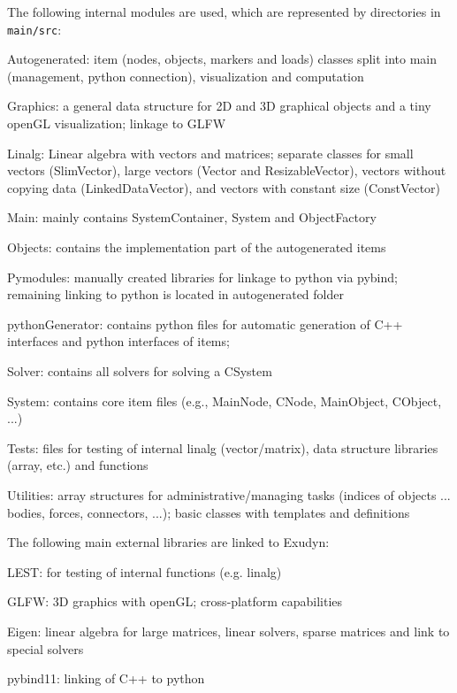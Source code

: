 The following internal modules are used, which are represented by directories in \texttt{main/src}:
\bi
	\item Autogenerated: item (nodes, objects, markers and loads) classes split into main (management, python connection), visualization and computation
	\item Graphics: a general data structure for 2D and 3D graphical objects and a tiny openGL visualization; linkage to GLFW
    \item Linalg: Linear algebra with vectors and matrices; separate classes for small vectors (SlimVector), large vectors (Vector and ResizableVector), vectors without copying data (LinkedDataVector), and vectors with constant size (ConstVector)
	\item Main: mainly contains SystemContainer, System and ObjectFactory
	\item Objects: contains the implementation part of the autogenerated items
	\item Pymodules: manually created libraries for linkage to python via pybind; remaining linking to python is located in autogenerated folder
	\item pythonGenerator: contains python files for automatic generation of C++ interfaces and python interfaces of items;
	\item Solver: contains all solvers for solving a CSystem
	\item System: contains core item files (e.g., MainNode, CNode, MainObject, CObject, ...)
	\item Tests: files for testing of internal linalg (vector/matrix), data structure libraries (array, etc.) and functions
    \item Utilities: array structures for administrative/managing tasks (indices of objects ... bodies, forces, connectors, ...); basic classes with templates and definitions
\ei

The following main external libraries are linked to Exudyn:
\bi
	\item LEST: for testing of internal functions (e.g. linalg)
	\item GLFW: 3D graphics with openGL; cross-platform capabilities
	\item Eigen: linear algebra for large matrices, linear solvers, sparse matrices and link to special solvers
	\item pybind11: linking of C++ to python
\ei

